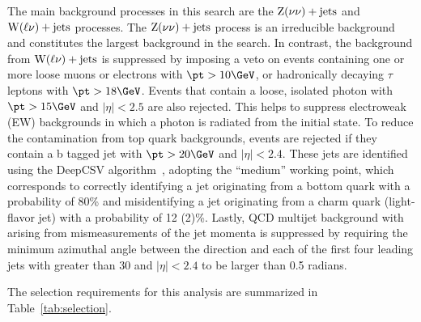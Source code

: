The main background processes in this search are the $\mathrm{Z}(\nu\nu)+\textrm{jets}$ and $\mathrm{W}(\ell\nu)+\textrm{jets}$ processes. The $\mathrm{Z}(\nu\nu)+\textrm{jets}$ process is an irreducible 
background and constitutes the largest background in the search. In contrast, the background from $\mathrm{W}(\ell\nu)+\textrm{jets}$ is suppressed by 
imposing a veto on events containing one or more loose muons or electrons with $ \pt >10\GeV$, or hadronically decaying $\tau$ 
leptons with $\pt>18\GeV$. Events that contain a loose, isolated photon with $\pt>15\GeV$ and $|\eta| < 2.5$ are also rejected. 
This helps to suppress electroweak (EW) backgrounds in which a photon is radiated from the initial state.
To reduce the contamination from top quark backgrounds, events are rejected if they contain a b tagged jet with $\pt > 20\GeV$ 
and $|\eta| < 2.4$. These jets are identified using the DeepCSV algorithm~\cite{CMS_NOTE_2018-323,Sirunyan:2017ezt}, 
adopting the ``medium'' working point, which corresponds to correctly identifying a jet originating from a bottom quark with 
a probability of 80\% and misidentifying a jet originating from a charm quark (light-flavor jet) with a probability of 12 (2)\%. 
Lastly, QCD multijet background with \ETm arising from mismeasurements of the jet momenta is suppressed by requiring the minimum
azimuthal angle between the \ptvecmiss direction and each of the first four leading jets with \pt greater than 30\GeV 
and $|\eta| < 2.4$ to be larger than 0.5 radians.

The selection requirements for this analysis are summarized in Table~\ref{tab:selection}.

